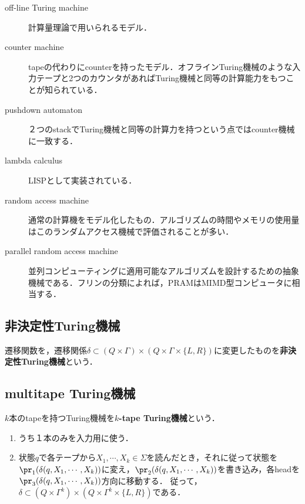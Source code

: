 \begin{tcolorbox}[colframe=ForestGreen, colback=ForestGreen!10!white, breakable]
    \begin{description}
        \item[off-line Turing machine] 計算量理論で用いられるモデル．
        \item[counter machine] tapeの代わりにcounterを持ったモデル．オフラインTuring機械のような入力テープと2つのカウンタがあればTuring機械と同等の計算能力をもつことが知られている．
        \item[pushdown automaton] ２つのstackでTuring機械と同等の計算力を持つという点ではcounter機械に一致する．
        \item[lambda calculus] LISPとして実装されている．
        \item[random access machine] 通常の計算機をモデル化したもの．アルゴリズムの時間やメモリの使用量はこのランダムアクセス機械で評価されることが多い．
        \item[parallel random access machine] 並列コンピューティングに適用可能なアルゴリズムを設計するための抽象機械である．フリンの分類によれば，PRAMはMIMD型コンピュータに相当する．
    \end{description}
\end{tcolorbox}

\subsection{非決定性Turing機械}

\begin{definition}
    遷移関数を，遷移関係$\delta\subset(Q\times\Gamma)\times(Q\times\Gamma\times\{L,R\})$に変更したものを\textbf{非決定性Turing機械}という．
\end{definition}

\subsection{multitape Turing機械}

\begin{definition}
    $k$本のtapeを持つTuring機械を\textbf{$k$-tape Turing機械}という．
    \begin{enumerate}
        \item うち１本のみを入力用に使う．
        \item 状態$q$で各テープから$X_1,\cdots,X_k\in\Sigma$を読んだとき，それに従って状態を$\pr_1(\delta(q,X_1,\cdots,X_k))$に変え，$\pr_2(\delta(q,X_1,\cdots,X_k))$を書き込み，各headを$\pr_3(\delta(q,X_1,\cdots,X_k))$方向に移動する．
        従って，$\delta\subset(Q\times\Gamma^k)\times(Q\times\Gamma^k\times\{L,R\})$である．
    \end{enumerate}
\end{definition}

